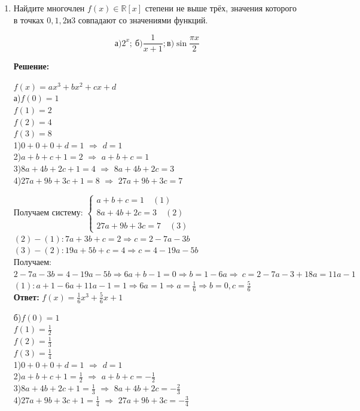 \documentclass[]{book}
\theoremstyle{definition}
\newcommand{\bb}[1]{\mathbb{#1}}
\begin{document}
\begin{enumerate}
\item Найдите многочлен $f(x)\in\bb{R}[x]$ степени не выше трёх, значения которого в точках $0, 1, 2 и 3$ совпадают со значениями функций.

$$\text{а)}2^x;\ \text{б)}\frac{1}{x+1};\text{в)}\sin{\frac{\pi x}{2}}$$

\textbf{Решение:}

$f(x) = ax^3+bx^2+cx+d$\\
а)$f(0) = 1$\\
$f(1) = 2$\\
$f(2) = 4$\\
$f(3) = 8$\\
1)$0+0+0+d=1$ $\Longrightarrow$ $d=1$\\
2)$a+b+c+1=2$ $\Longrightarrow$ $a+b+c=1$\\
3)$8a+4b+2c+1=4$ $\Longrightarrow$ $8a+4b+2c=3$\\
4)$27a+9b+3c+1=8$ $\Longrightarrow$ $27a+9b+3c=7$

Получаем систему: 
$
\begin{cases}
   a+b+c=1 \quad (1) \\
   8a+4b+2c=3\quad (2) \\
   27a+9b+3c=7\quad (3)
 \end{cases}
$\\
$(2)-(1)\colon 7a+3b+c=2 \Longrightarrow c = 2-7a-3b$\\
$(3)-(2)\colon 19a+5b+c=4 \Longrightarrow c = 4-19a-5b$\\
Получаем: $2-7a-3b=4-19a-5b \Longrightarrow 6a+b-1=0  \Longrightarrow b=1-6a \Longrightarrow\ c=2-7a-3+18a = 11a-1$\\
$(1): a+1-6a+11a-1=1 \Longrightarrow 6a = 1 \Longrightarrow a = \frac{1}{6} \Longrightarrow b = 0, c =\frac{5}{6}$\\
\textbf{Ответ: } $f(x) = \frac{1}{6}x^3+\frac{5}{6}x+1$

б)$f(0) = 1$\\
$f(1) = \frac{1}{2}$\\
$f(2) = \frac{1}{3}$\\
$f(3) = \frac{1}{4}$\\
1)$0+0+0+d=1$ $\Longrightarrow$ $d=1$\\
2)$a+b+c+1=\frac{1}{2}$ $\Longrightarrow$ $a+b+c=-\frac{1}{2}$\\
3)$8a+4b+2c+1=\frac{1}{3}$ $\Longrightarrow$ $8a+4b+2c=-\frac{2}{3}$\\
4)$27a+9b+3c+1=\frac{1}{4}$ $\Longrightarrow$ $27a+9b+3c=-\frac{3}{4}$


\end{enumerate}
\end{document}
